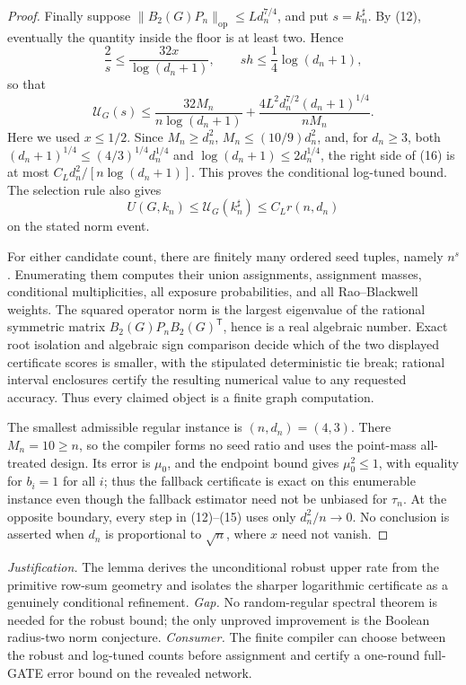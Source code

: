 \documentclass{article}
\begin{document}
\begin{proof}
Finally suppose \(\|B_2(G)P_n\|_{\mathrm{op}}\le Ld_n^{7/4}\), and put
\(s=k_n^\sharp\).  By (12), eventually the quantity inside the floor is at least two.  Hence
\[
\frac2s\le\frac{32x}{\log(d_n+1)},
\qquad
sh\le\frac14\log(d_n+1),
\]
so that
\[
\mathcal U_G(s)
\le\frac{32M_n}{n\log(d_n+1)}
+\frac{4L^2d_n^{7/2}(d_n+1)^{1/4}}{nM_n}.
\tag{16}
\]
Here we used \(x\le1/2\).  Since \(M_n\ge d_n^2\), \(M_n\le(10/9)d_n^2\), and, for \(d_n\ge3\), both \((d_n+1)^{1/4}\le(4/3)^{1/4}d_n^{1/4}\) and \(\log(d_n+1)\le2d_n^{1/4}\), the right side of (16) is at most \(C_Ld_n^2/[n\log(d_n+1)]\).  This proves the conditional log-tuned bound.
The selection rule also gives
\[
U(G,k_n)\le\mathcal U_G(k_n^\sharp)\le C_Lr(n,d_n)
\]
on the stated norm event.

For either candidate count, there are finitely many ordered seed tuples, namely \(n^s\).  Enumerating them computes their union assignments, assignment masses, conditional multiplicities, all exposure probabilities, and all Rao--Blackwell weights.  The squared operator norm is the largest eigenvalue of the rational symmetric matrix \(B_2(G)P_nB_2(G)^{\mathsf T}\), hence is a real algebraic number.  Exact root isolation and algebraic sign comparison decide which of the two displayed certificate scores is smaller, with the stipulated deterministic tie break; rational interval enclosures certify the resulting numerical value to any requested accuracy.  Thus every claimed object is a finite graph computation.

The smallest admissible regular instance is \((n,d_n)=(4,3)\).  There \(M_n=10\ge n\), so the compiler forms no seed ratio and uses the point-mass all-treated design.  Its error is \(\mu_0\), and the endpoint bound gives \(\mu_0^2\le1\), with equality for \(b_i=1\) for all \(i\); thus the fallback certificate is exact on this enumerable instance even though the fallback estimator need not be unbiased for \(\tau_n\).  At the opposite boundary, every step in (12)--(15) uses only \(d_n^2/n\to0\).  No conclusion is asserted when \(d_n\) is proportional to \(\sqrt n\), where \(x\) need not vanish.
\end{proof}
\par\smallskip\noindent \textit{Justification.} The lemma derives the unconditional robust upper rate from the primitive row-sum geometry and isolates the sharper logarithmic certificate as a genuinely conditional refinement. \textit{Gap.} No random-regular spectral theorem is needed for the robust bound; the only unproved improvement is the Boolean radius-two norm conjecture. \textit{Consumer.} The finite compiler can choose between the robust and log-tuned counts before assignment and certify a one-round full-GATE error bound on the revealed network.
\end{document}
